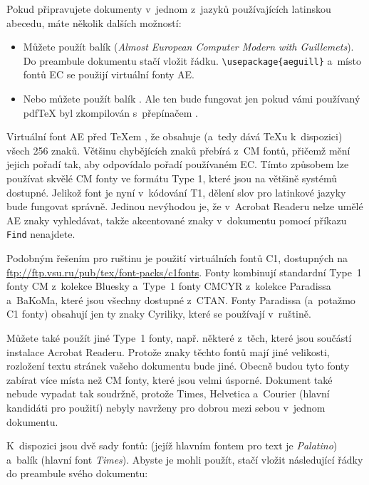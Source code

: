 Pokud připravujete dokumenty v~jednom z~jazyků používajících
latinskou abecedu, máte několik dalších možností:
\begin{itemize}
\item Můžete použít balík 
  (\emph{Almost European Computer Modern with Guillemets}).
  Do preambule dokumentu stačí vložit řádku.
  \newline \verb+\usepackage{aeguill}+ \newline
  a~místo fontů EC se použijí virtuální fonty AE.
\item Nebo můžete použít balík . Ale ten bude
  fungovat jen pokud vámi používaný pdf\TeX{} byl zkompilován
  s~přepínačem .
\end{itemize}
Virtuální font AE před \TeX em , že obsahuje (a~tedy
dává \TeX u k~dispozici) všech 256 znaků. Většinu chybějících znaků
přebírá z~CM fontů, přičemž mění jejich pořadí tak, aby odpovídalo
pořadí používaném EC. Tímto způsobem lze používat skvělé CM fonty
ve formátu Type 1, které jsou na většině systémů dostupné. Jelikož
font je nyní v~kódování T1, dělení slov pro latinkové jazyky bude
fungovat správně. Jedinou nevýhodou je, že v~Acrobat Readeru nelze
umělé AE znaky vyhledávat, takže akcentované znaky v~dokumentu
pomocí příkazu \texttt{Find} nenajdete.

Podobným řešením pro ruštinu je použití virtuálních fontů C1,
dostupných na \url{ftp://ftp.vsu.ru/pub/tex/font-packs/c1fonts}.
Fonty kombinují standardní Type~1 fonty CM z~kolekce Bluesky
a~Type~1 fonty CMCYR z~kolekce Paradissa a~BaKoMa, které jsou
všechny dostupné z~CTAN. Fonty Paradissa (a~potažmo C1 fonty)
obsahují jen ty znaky Cyriliky, které se používají v~ruštině.

Můžete také použít jiné \PSi{} Type~1 fonty, např. některé z~těch,
které jsou součástí instalace Acrobat Readeru. Protože znaky
těchto fontů mají jiné velikosti, rozložení textu stránek vašeho
dokumentu bude jiné. Obecně budou tyto fonty zabírat více místa
než CM fonty, které jsou velmi úsporné. Dokument také
nebude vypadat tak soudržně, protože Times, Helvetica a~Courier
(hlavní kandidáti pro použití) nebyly navrženy pro dobrou
 mezi sebou v~jednom dokumentu.

K~dispozici jsou dvě sady fontů:  (jejíž hlavním
fontem pro text je \emph{Palatino}) a~balík 
(hlavní font \emph{Times}). Abyste je mohli použít, stačí vložit
následující řádky do preambule svého dokumentu:

